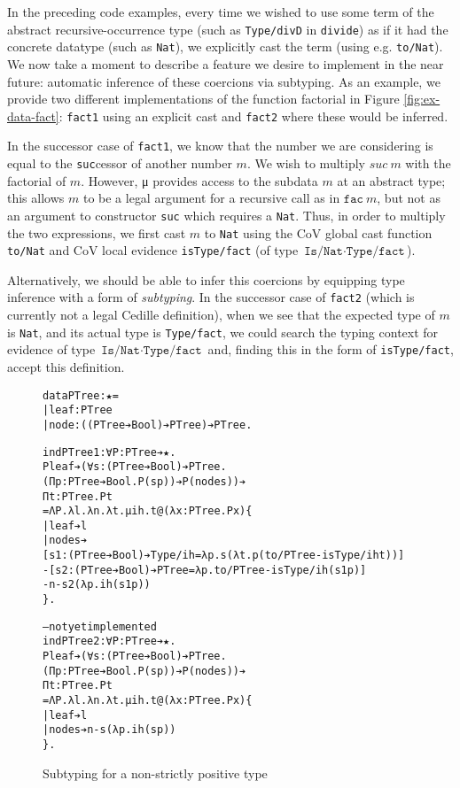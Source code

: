 \documentclass{article}
\begin{document}
In the preceding code examples, every time we wished to use some term of the
abstract recursive-occurrence type (such as \texttt{Type/divD} in
\texttt{divide}) as if it had the concrete datatype (such as \texttt{Nat}), we
explicitly cast the term (using e.g. \texttt{to/Nat}). We now take a moment to
describe a feature we desire to implement in the near future: automatic
inference of these coercions via subtyping. As an example, we provide two
different implementations of the function factorial in Figure
\ref{fig:ex-data-fact}: \texttt{fact1} using an explicit cast and \texttt{fact2}
where these would be inferred.

In the successor case of \texttt{fact1}, we know that the number we are
considering is equal to the \texttt{suc}cessor of another number $m$. We wish to
multiply \(suc\ m\) with the factorial of $m$. However, μ provides access to the
subdata $m$ at an abstract type; this allows $m$ to be a legal argument for a
recursive call as in \(\texttt{fac}\ m\), but not as an argument to constructor
\texttt{suc} which requires a \texttt{Nat}. Thus, in order to multiply the two
expressions, we first cast $m$ to \texttt{Nat} using the CoV global cast function
\texttt{to/Nat} and CoV local evidence \texttt{isType/fact} (of type
\(\texttt{Is/Nat} ·\texttt{Type/fact}\)).

Alternatively, we should be able to infer this coercions by equipping type
inference with a form of \textit{subtyping}. In the successor case of
\texttt{fact2} (which is currently not a legal Cedille definition), when we see
that the expected type of $m$ is \texttt{Nat}, and its actual type is
\texttt{Type/fact}, we could search the typing context for evidence of type
\(\texttt{Is/Nat} ·\texttt{Type/fact}\) and, finding this in the form of
\texttt{isType/fact}, accept this definition.

\begin{figure}[h]
\begin{alltt}
data PTree: ★ =
  | leaf: PTree
  | node: ((PTree ➔ Bool) ➔ PTree) ➔ PTree.

indPTree1 : ∀ P: PTree ➔ ★.
  P leaf ➔ (∀ s: (PTree ➔ Bool) ➔ PTree. (Π p: PTree ➔ Bool. P (s p)) ➔ P (node s)) ➔
  Π t: PTree. P t
= Λ P. λ l. λ n. λ t. μ ih. t @(λ x: PTree. P x) \{
  | leaf ➔ l
  | node s ➔
    [s1 : (PTree ➔ Bool) ➔ Type/ih = λ p. s (λ t. p (to/PTree -isType/ih t))]
  - [s2 : (PTree ➔ Bool) ➔ PTree   = λ p. to/PTree -isType/ih (s1 p)]
  - n -s2 (λ p. ih (s1 p))
  \}.

-- not yet implemented
indPTree2 : ∀ P: PTree ➔ ★.
  P leaf ➔ (∀ s: (PTree ➔ Bool) ➔ PTree. (Π p: PTree ➔ Bool. P (s p)) ➔ P (node s)) ➔
  Π t: PTree. P t
=  Λ P. λ l. λ n. λ t. μ ih. t @(λ x: PTree. P x) \{
| leaf ➔ l
| node s ➔ n -s (λ p. ih (s p))
\}.
\end{alltt}
  \caption{Subtyping for a non-strictly positive type}
  \label{fig:ptree}
\end{figure}
\end{document}
